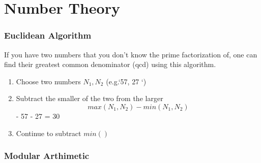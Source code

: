 \chapter{Number Theory}
\subsection{Euclidean Algorithm}

If you have two numbers that you don't know the prime factorization of, one can find their greatest common denominator (qcd) using this algorithm. 
\begin{enumerate}
\item Choose two numbers $N_1, N_2$ (e.g.`57, 27 `)
\item Subtract the smaller of the two from the larger $$max(N_1,N_2) - min(N_1,N_2)$$
    - 57 - 27 = 30
\item Continue to subtract $min()$
\end{enumerate}

\subsection{Modular Arthimetic}
